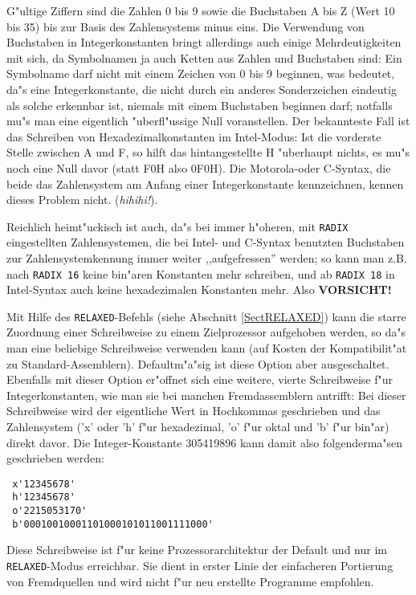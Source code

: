 \documentclass[12pt,a4paper,twoside]{report}
\newcommand{\ii}[1]{{\it #1}}
\newcommand{\tty}[1]{{\tt #1}}
\begin{document}
G"ultige Ziffern sind die Zahlen 0 bis 9 sowie die Buchstaben A bis Z
(Wert 10 bis 35) bis zur Basis des Zahlensystems minus eins.  Die
Verwendung von Buchstaben in Integerkonstanten bringt allerdings auch
einige Mehrdeutigkeiten mit sich, da Symbolnamen ja auch Ketten aus Zahlen
und Buchstaben sind: Ein Symbolname darf nicht mit einem Zeichen von 0 bis
9 beginnen, was bedeutet, da"s eine Integerkonstante, die nicht durch ein
anderes Sonderzeichen eindeutig als solche erkennbar ist, niemals mit
einem Buchstaben beginnen darf; notfalls mu"s man eine eigentlich
"uberfl"ussige Null voranstellen.  Der bekannteste Fall ist das Schreiben
von Hexadezimalkonstanten im Intel-Modus: Ist die vorderste Stelle
zwischen A und F, so hilft das hintangestellte H "uberhaupt nichts, es
mu"s noch eine Null davor (statt F0H also 0F0H).  Die Motorola-oder
C-Syntax, die beide das Zahlensystem am Anfang einer Integerkonstante
kennzeichnen, kennen dieses Problem nicht. (\ii{hihihi!}).

Reichlich heimt"uckisch ist auch, da"s bei immer h"oheren, mit {\tt RADIX}
eingestellten Zahlensystemen, die bei Intel- und C-Syntax benutzten
Buchstaben zur Zahlensystemkennung immer weiter ,,aufgefressen'' werden; so
kann man z.B. nach {\tt RADIX 16} keine bin"aren Konstanten mehr
schreiben, und ab {\tt RADIX 18} in Intel-Syntax auch keine hexadezimalen
Konstanten mehr.  Also {\bf VORSICHT!}

Mit Hilfe des \tty{RELAXED}-Befehls (siehe Abschnitt \ref{SectRELAXED})
kann die starre Zuordnung einer Schreibweise zu einem Zielprozessor
aufgehoben werden, so da"s man eine beliebige Schreibweise verwenden
kann (auf Kosten der Kompatibilit"at zu Standard-Assemblern).
Defaultm"a"sig ist diese Option aber ausgeschaltet.  Ebenfalls mit dieser
Option er"offnet sich eine weitere, vierte Schreibweise f"ur
Integerkonstanten, wie man sie bei manchen Fremdassemblern antrifft:  Bei
dieser Schreibweise wird der eigentliche Wert in Hochkommas geschrieben
und das Zahlensystem ('x' oder 'h' f"ur hexadezimal, 'o' f"ur oktal und 'b'
f"ur bin"ar) direkt davor.  Die Integer-Konstante 305419896 kann damit
also folgenderma"sen geschrieben werden:
\begin{verbatim}
 x'12345678'
 h'12345678'
 o'2215053170'
 b'00010010001101000101011001111000'
\end{verbatim}
Diese Schreibweise ist f"ur keine Prozessorarchitektur der Default und nur
im \tty{RELAXED}-Modus erreichbar.  Sie dient in erster Linie der
einfacheren Portierung von Fremdquellen und wird nicht f"ur neu erstellte
Programme empfohlen.
\end{document}
